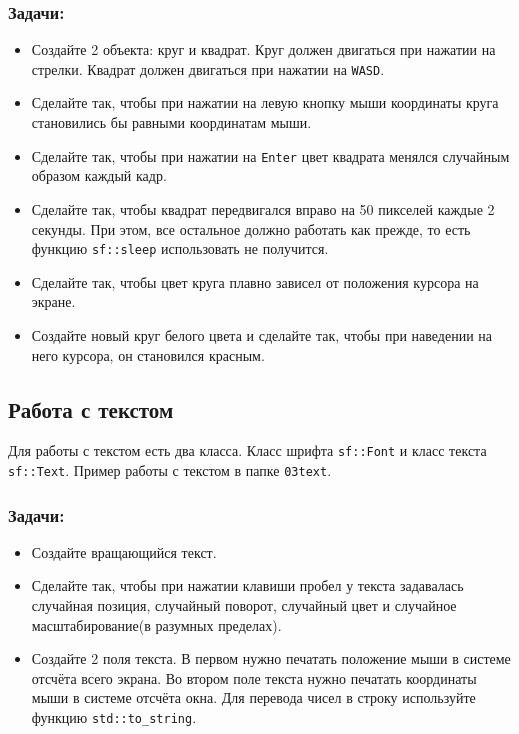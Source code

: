 \documentclass{article}
\begin{document}
\subsubsection*{Задачи:}
\begin{itemize}
\item Создайте 2 объекта: круг и квадрат. Круг должен двигаться при нажатии на стрелки. Квадрат должен двигаться при нажатии на \texttt{WASD}.
\item Сделайте так, чтобы при нажатии на левую кнопку мыши координаты круга становились бы равными координатам мыши.
\item Сделайте так, чтобы при нажатии на \texttt{Enter} цвет квадрата менялся случайным образом каждый кадр.
\item Сделайте так, чтобы квадрат передвигался вправо на 50 пикселей каждые 2 секунды. При этом, все остальное должно работать как прежде, то есть функцию \texttt{sf::sleep} использовать не получится.
\item Сделайте так, чтобы цвет круга плавно зависел от положения курсора на экране.

\item Создайте новый круг белого цвета и сделайте так, чтобы при наведении на него курсора, он становился красным.
\end{itemize}


\subsection*{Работа с текстом}
Для работы с текстом есть два класса. Класс шрифта \texttt{sf::Font} и класс текста \texttt{sf::Text}. Пример работы с текстом в папке \texttt{03text}.
\subsubsection*{Задачи:}
\begin{itemize}
\item Создайте вращающийся текст.
\item Сделайте так, чтобы при нажатии клавиши пробел у текста задавалась случайная позиция, случайный поворот, случайный цвет и случайное масштабирование(в разумных пределах).
\item Создайте 2 поля текста. В первом нужно печатать положение мыши в системе отсчёта всего экрана. Во втором поле текста нужно печатать координаты мыши в системе отсчёта окна. Для перевода чисел в строку используйте функцию \texttt{std::to\_string}.
\end{itemize}
\end{document}
